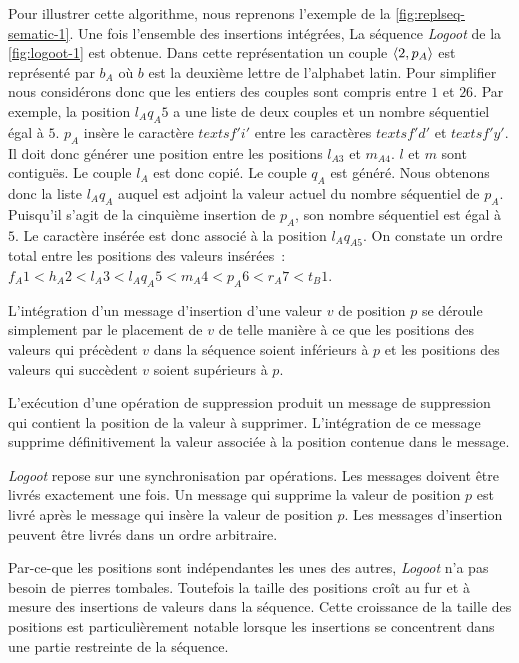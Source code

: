 Pour illustrer cette algorithme, nous reprenons l'exemple de la \autoref{fig:replseq-sematic-1}.
Une fois l'ensemble des insertions intégrées, La séquence \emph{Logoot} de la \autoref{fig:logoot-1} est obtenue.
Dans cette représentation un couple $\tuple*{2, p_A}$ est représenté par $b_A$ où $b$ est la deuxième lettre de l'alphabet latin.
Pour simplifier nous considérons donc que les entiers des couples sont compris entre $1$ et $26$.
Par exemple, la position $l_Aq_A5$ a une liste de deux couples et un nombre séquentiel égal à $5$.
$p_A$ insère le caractère $textsf{'\textit{i}'}$ entre les caractères $textsf{'\textit{d}'}$ et $textsf{'\textit{y}'}$.
Il doit donc générer une position entre les positions $l_{A3}$ et $m_{A4}$.
$l$ et $m$ sont contiguës.
Le couple $l_A$ est donc copié.
Le couple $q_A$ est généré.
Nous obtenons donc la liste $l_Aq_A$ auquel est adjoint la valeur actuel du nombre séquentiel de $p_A$.
Puisqu'il s'agit de la cinquième insertion de $p_A$, son nombre séquentiel est égal à $5$.
Le caractère insérée est donc associé à la position $l_Aq_{A5}$.
On constate un ordre total entre les positions des valeurs insérées~: $f_A1 < h_A2 < l_A3 < l_Aq_A5 < m_A4 < p_A6 < r_A7 < t_B1$.

L'intégration d'un message d'insertion d'une valeur $v$ de position $p$ se déroule simplement par le placement de $v$ de telle manière à ce que les positions des valeurs qui précèdent $v$ dans la séquence soient inférieurs à $p$ et les positions des valeurs qui succèdent $v$ soient supérieurs à $p$.

L'exécution d'une opération de suppression produit un message de suppression qui contient la position de la valeur à supprimer.
L'intégration de ce message supprime définitivement la valeur associée à la position contenue dans le message.

\emph{Logoot} repose sur une synchronisation par opérations.
Les messages doivent être livrés exactement une fois.
Un message qui supprime la valeur de position $p$ est livré après le message qui insère la valeur de position $p$.
Les messages d'insertion peuvent être livrés dans un ordre arbitraire.

Par-ce-que les positions sont indépendantes les unes des autres, \emph{Logoot} n'a pas  besoin de pierres tombales.
Toutefois la taille des positions croît au fur et à mesure des insertions de valeurs dans la séquence.
Cette croissance de la taille des positions est particulièrement notable lorsque les insertions se concentrent dans une partie restreinte de la séquence.


